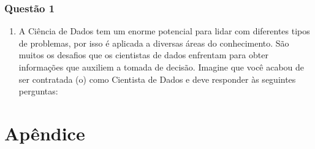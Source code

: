 \documentclass[
]{book}
\providecommand{\tightlist}{%
  \setlength{\itemsep}{0pt}\setlength{\parskip}{0pt}}
\begin{document}
\hypertarget{questuxe3o-1}{%
\subsection*{Questão 1}\label{questuxe3o-1}}

\begin{enumerate}
\def\labelenumi{\alph{enumi}.}
\tightlist
\item
  A Ciência de Dados tem um enorme potencial para lidar com diferentes tipos de problemas, por isso é aplicada a diversas áreas do conhecimento. São muitos os desafios que os cientistas de dados enfrentam para obter informações que auxiliem a tomada de decisão. Imagine que você acabou de ser contratada (o) como Cientista de Dados e deve responder às seguintes perguntas:
\end{enumerate}

\hypertarget{apuxeandice}{%
\chapter*{Apêndice}\label{apuxeandice}}

  
\end{document}
